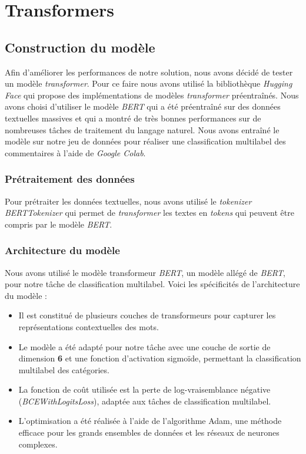 \chapter{Transformers}

\section{Construction du modèle}

Afin d'améliorer les performances de notre solution, nous avons décidé de tester un modèle \textit{transformer}.
Pour ce faire nous avons utilisé la bibliothèque \textit{Hugging Face} qui propose des implémentations de modèles \textit{transformer} préentraînés.
Nous avons choisi d'utiliser le modèle \textit{BERT} qui a été préentraîné sur des données textuelles massives et qui a montré de très bonnes performances sur de nombreuses tâches de traitement du langage naturel.
Nous avons entraîné le modèle sur notre jeu de données pour réaliser une classification multilabel des commentaires à l'aide de \textit{Google Colab}.

\subsection{Prétraitement des données}

Pour prétraiter les données textuelles, nous avons utilisé le \textit{tokenizer} \textit{BERTTokenizer} qui permet de \textit{transformer} les textes en \textit{tokens} qui peuvent être compris par le modèle \textit{BERT}.

\subsection{Architecture du modèle}

Nous avons utilisé le modèle transformeur \textit{BERT}, un modèle allégé de \textit{BERT}, pour notre tâche de classification multilabel. Voici les spécificités de l'architecture du modèle :

\begin{itemize}
\item Il est constitué de plusieurs couches de transformeurs pour capturer les représentations contextuelles des mots.
\item Le modèle a été adapté pour notre tâche avec une couche de sortie de dimension \textbf{6} et une fonction d'activation sigmoïde, permettant la classification multilabel des catégories.
\item La fonction de coût utilisée est la perte de log-vraisemblance négative (\textit{BCEWithLogitsLoss}), adaptée aux tâches de classification multilabel.
\item L'optimisation a été réalisée à l'aide de l'algorithme Adam, une méthode efficace pour les grands ensembles de données et les réseaux de neurones complexes.
\end{itemize}

